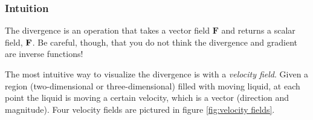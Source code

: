 \documentclass{myarticle}
\let\div\relax %
\DeclareMathOperator{\div}{div}
\renewcommand{\vec}[1]{\mathbf{#1}}
\theoremstyle{nospace}
\newtheorem{old series theorem}{Theorem}
\newenvironment{series theorem}
{\begin{mdframed}\begin{old series theorem}}
    {\end{old series theorem}\end{mdframed}}
\begin{document}
\subsubsection{Intuition}
\label{sec:divergence intuition}

The divergence is an operation that takes a vector field $\vec{F}$ and
returns a scalar field, $\div \vec{F}$. Be careful, though, that you
do not think the divergence and gradient are inverse functions!

The most intuitive way to visualize the divergence is with a
\textit{velocity field}. Given a region (two-dimensional or
three-dimensional) filled with moving liquid, at each point the liquid
is moving a certain velocity, which is a vector (direction and
magnitude). Four velocity fields are pictured in figure
\ref{fig:velocity fields}.
\end{document}
